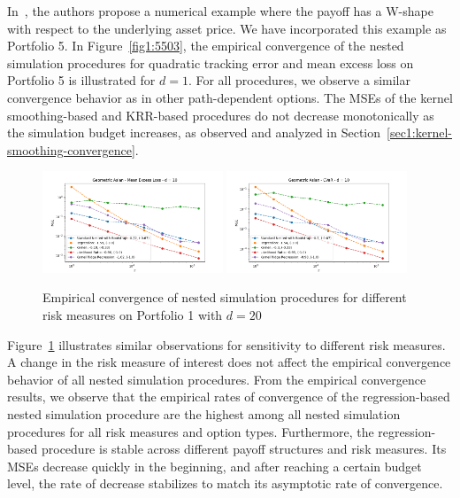 In~\cite{broadie2015risk}, the authors propose a numerical example where the payoff has a W-shape with respect to the underlying asset price.
We have incorporated this example as Portfolio 5.
In Figure~\ref{fig1:5503}, the empirical convergence of the nested simulation procedures for quadratic tracking error and mean excess loss on Portfolio 5 is illustrated for $d = 1$.
For all procedures, we observe a similar convergence behavior as in other path-dependent options.
The MSEs of the kernel smoothing-based and KRR-based procedures do not decrease monotonically as the simulation budget increases, as observed and analyzed in Section~\ref{sec1:kernel-smoothing-convergence}.

\begin{figure}[ht!] 
    \centering
    \includegraphics[width=0.48\textwidth]{./project1/figures/figure8a.png}
    \includegraphics[width=0.48\textwidth]{./project1/figures/figure8b.png}
    \caption{Empirical convergence of nested simulation procedures for different risk measures on Portfolio 1 with $d=20$}
    \label{fig1:110x}
\end{figure}

Figure~\ref{fig1:110x} illustrates similar observations for sensitivity to different risk measures.
A change in the risk measure of interest does not affect the empirical convergence behavior of all nested simulation procedures.
From the empirical convergence results, we observe that the empirical rates of convergence of the regression-based nested simulation procedure are the highest among all nested simulation procedures for all risk measures and option types.
Furthermore, the regression-based procedure is stable across different payoff structures and risk measures. 
Its MSEs decrease quickly in the beginning, and after reaching a certain budget level, the rate of decrease stabilizes to match its asymptotic rate of convergence.

